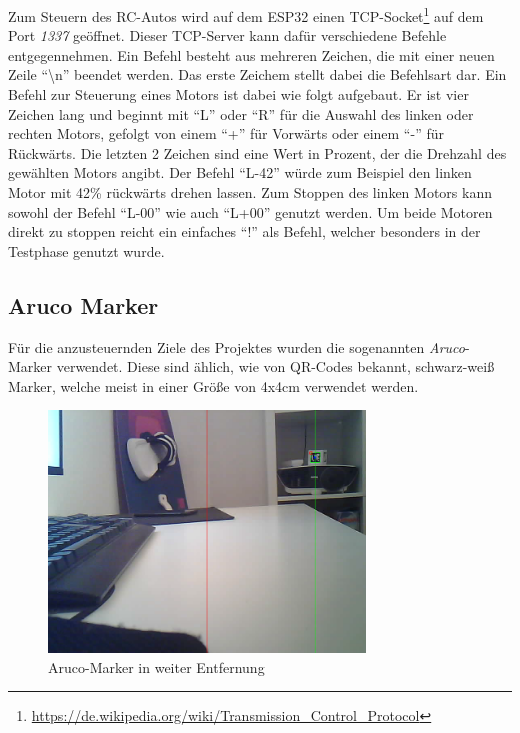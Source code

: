 \documentclass{article}
\begin{document}
Zum Steuern des RC-Autos wird auf dem ESP32 einen TCP-Socket\footnote{\url{https://de.wikipedia.org/wiki/Transmission_Control_Protocol}}
auf dem Port \textit{1337} geöffnet. Dieser TCP-Server kann dafür verschiedene Befehle entgegennehmen. Ein Befehl besteht aus mehreren Zeichen,
die mit einer neuen Zeile \enquote{\textbackslash n} beendet werden. Das erste Zeichem stellt dabei die Befehlsart dar.
Ein Befehl zur Steuerung eines Motors ist dabei wie folgt aufgebaut.
Er ist vier Zeichen lang und beginnt mit \enquote{L} oder \enquote{R} für die Auswahl des linken oder rechten Motors,
gefolgt von einem \enquote{+} für Vorwärts oder einem \enquote{-} für Rückwärts. Die letzten 2 Zeichen sind eine Wert in Prozent, der die
Drehzahl des gewählten Motors angibt. Der Befehl \enquote{L-42} würde zum Beispiel den linken Motor mit 42\% rückwärts drehen lassen.
Zum Stoppen des linken Motors kann sowohl der Befehl \enquote{L-00} wie auch \enquote{L+00} genutzt werden. Um beide Motoren direkt zu
stoppen reicht ein einfaches \enquote{!} als Befehl, welcher besonders in der Testphase genutzt wurde.

\subsection{Aruco Marker}

Für die anzusteuernden Ziele des Projektes wurden die sogenannten \textit{Aruco}-Marker verwendet.
Diese sind ählich, wie von QR-Codes bekannt, schwarz-weiß Marker, welche meist in einer Größe von 4x4cm verwendet werden.

\begin{figure}[H]
  \begin{center}
    \includegraphics[width=0.75\textwidth]{detect.png}
    \caption{Aruco-Marker in weiter Entfernung}
  \end{center}
\end{figure}
\end{document}
